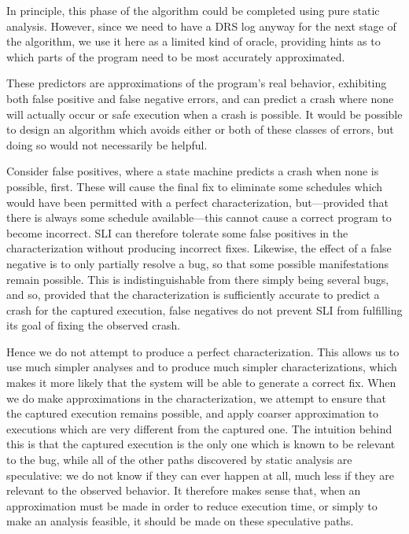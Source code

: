   
In principle, this phase of the algorithm could be completed using
pure static analysis.  However, since we need to have a DRS log anyway
for the next stage of the algorithm, we use it here as a limited kind
of oracle, providing hints as to which parts of the program need to be
most accurately approximated.

These predictors are approximations of the program's real behavior,
exhibiting both false positive and false negative errors, and can
predict a crash where none will actually occur or safe execution when
a crash is possible.  It would be possible to design an algorithm
which avoids either or both of these classes of errors, but doing so
would not necessarily be helpful.

Consider false positives, where a state machine predicts a crash when
none is possible, first.  These will cause the final fix to eliminate
some schedules which would have been permitted with a perfect
characterization, but---provided that there is always some schedule
available---this cannot cause a correct program to become incorrect.
SLI can therefore tolerate some false positives in the
characterization without producing incorrect fixes.  Likewise, the
effect of a false negative is to only partially resolve a bug, so that
some possible manifestations remain possible.  This is
indistinguishable from there simply being several bugs, and so,
provided that the characterization is sufficiently accurate to predict
a crash for the captured execution, false negatives do not prevent SLI
from fulfilling its goal of fixing the observed crash.

Hence we do not attempt to produce a perfect characterization.  This
allows us to use much simpler analyses and to produce much simpler
characterizations, which makes it more likely that the system will be
able to generate a correct fix.  When we do make approximations in the
characterization, we attempt to ensure that the captured execution
remains possible, and apply coarser approximation to executions which
are very different from the captured one.  The intuition behind this
is that the captured execution is the only one which is known to be
relevant to the bug, while all of the other paths discovered by static
analysis are speculative: we do not know if they can ever happen at
all, much less if they are relevant to the observed behavior.  It
therefore makes sense that, when an approximation must be made in
order to reduce execution time, or simply to make an analysis
feasible, it should be made on these speculative paths.







